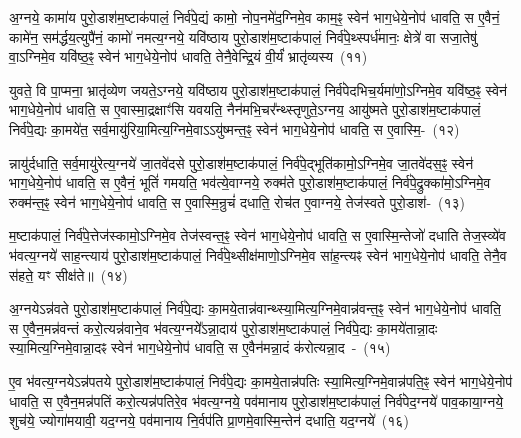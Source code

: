 {\anuvakamend[{व्र॒तप॑तये॒ निशि॑ताया॒न्निर्व॑पे॒त्पुरु॑षाः सङ्ग्रा॒मन्न च॒त्वारि॑ च}]}

अ॒ग्नये॒ कामा॑य पुरो॒डाश॑\-म॒ष्टा\-क॑पालं॒ निर्व॑पे॒द्यं कामो॒ नोप॒नमे॑द॒ग्निमे॒व काम॒ꣴ॒ स्वेन॑ भाग॒धेये॒नोप॑ धावति॒ स ए॒वैनं॒ कामे॑न॒ सम॑र्द्धय॒त्युपै॑नं॒ कामो॑ नमत्य॒ग्नये॒ यवि॑ष्ठाय पुरो॒डाश॑\-म॒ष्टा\-क॑पालं॒ निर्व॑पे॒थ्स्पर्ध॑मानः॒ क्षेत्रे॑ वा सजा॒तेषु॑ वा॒\-ऽग्निमे॒व यवि॑ष्ठ॒ꣴ॒ स्वेन॑ भाग॒धेये॒नोप॑ धावति॒ तेनै॒वेन्द्रि॒यं वी॒र्यं॑ भ्रातृ॑व्यस्य~(११)\ip

युवते॒ वि पा॒प्मना॒ भ्रातृ॑व्येण जयते॒\-ऽग्नये॒ यवि॑ष्ठाय पुरो॒डाश॑\-म॒ष्टा\-क॑पालं॒ निर्व॑पेदभिच॒र्यमा॑णो॒\-ऽग्निमे॒व यवि॑ष्ठ॒ꣴ॒ स्वेन॑ भाग॒धेये॒नोप॑ धावति॒ स ए॒वास्मा॒द्रक्षाꣳ॑सि यवयति॒ नैन॑मभि॒चर᳚न्थ्स्तृणुते॒\-ऽग्नय॒ आयु॑ष्मते पुरो॒डाश॑\-म॒ष्टा\-क॑पालं॒ निर्व॑पे॒द्यः का॒मये॑त॒ सर्व॒मायु॑रिया॒मित्य॒ग्निमे॒वा\-ऽऽ\-यु॑ष्मन्त॒ꣴ॒ स्वेन॑ भाग॒धेये॒नोप॑ धावति॒ स ए॒वास्मि॒-~(१२)\ip

न्नायु॑र्दधाति॒ सर्व॒मायु॑रेत्य॒ग्नये॑ जा॒तवे॑दसे पुरो॒डाश॑\-म॒ष्टा\-क॑पालं॒ निर्व॑पे॒द्भूति॑कामो॒\-ऽग्निमे॒व जा॒तवे॑दस॒ꣴ॒ स्वेन॑ भाग॒धेये॒नोप॑ धावति॒ स ए॒वैनं॒ भूतिं॑ गमयति॒ भव॑त्ये॒वाग्नये॒ रुक्म॑ते पुरो॒डाश॑\-म॒ष्टा\-क॑पालं॒ निर्व॑पे॒द्रुक्का॑मो॒\-ऽग्निमे॒व रुक्म॑न्त॒ꣴ॒ स्वेन॑ भाग॒धेये॒नोप॑ धावति॒ स ए॒वास्मि॒न्रुचं॑ दधाति॒ रोच॑त ए॒वाग्नये॒ तेज॑स्वते पुरो॒डाश॑-~(१३)\ip

म॒ष्टा\-क॑पालं॒ निर्व॑पे॒त्तेज॑स्कामो॒\-ऽग्निमे॒व तेज॑स्वन्त॒ꣴ॒ स्वेन॑ भाग॒धेये॒नोप॑ धावति॒ स ए॒वास्मि॒न्तेजो॑ दधाति तेज॒स्व्ये॑व भ॑वत्य॒ग्नये॑ साह॒न्त्याय॑ पुरो॒डाश॑\-म॒ष्टा\-क॑पालं॒ निर्व॑पे॒थ्सीक्ष॑माणो॒\-ऽग्निमे॒व सा॑ह॒न्त्यꣴ स्वेन॑ भाग॒धेये॒नोप॑ धावति॒ तेनै॒व स॑हते॒ यꣳ सीक्ष॑ते॥~(१४)\ip

{\anuvakamend[{भ्रातृ॑व्यस्यास्मि॒न्तेज॑स्वते पुरो॒डाश॑\-म॒ष्टात्रिꣳ॑शच्च}]}

अ॒ग्नये\-ऽन्न॑वते पुरो॒डाश॑\-म॒ष्टा\-क॑पालं॒ निर्व॑पे॒द्यः का॒मये॒तान्न॑\-वान्थ्स्या॒मित्य॒ग्नि\-मे॒वान्न॑वन्त॒ꣴ॒ स्वेन॑ भाग॒धेये॒नोप॑ धावति॒ स ए॒वैन॒मन्न॑वन्तं करो॒त्यन्न॑वाने॒व भ॑वत्य॒ग्नये᳚\-ऽन्ना॒दाय॑ पुरो॒डाश॑\-म॒ष्टाक॑पालं॒ निर्व॑पे॒द्यः का॒मये॑तान्ना॒दः स्या॒मित्य॒ग्निमे॒वान्ना॒दꣴ स्वेन॑ भाग॒धेये॒नोप॑ धावति॒ स ए॒वैन॑मन्ना॒दं क॑रोत्यन्ना॒द~-~(१५)\ip

ए॒व भ॑वत्य॒ग्नये\-ऽन्न॑पतये पुरो॒डाश॑\-म॒ष्टा\-क॑पालं॒ निर्व॑पे॒द्यः का॒मये॒तान्न॑पतिः स्या॒मित्य॒ग्नि\-मे॒वान्न॑\-पति॒ꣴ॒ स्वेन॑ भाग॒धेये॒नोप॑ धावति॒ स ए॒वैन॒मन्न॑पतिं करो॒त्यन्न॑पतिरे॒व भ॑वत्य॒ग्नये॒ पव॑मानाय पुरो॒डाश॑\-म॒ष्टा\-क॑पालं॒ निर्व॑पेद॒ग्नये॑ पाव॒काया॒ग्नये॒ शुच॑ये॒ ज्योगा॑मयावी॒ यद॒ग्नये॒ पव॑मानाय नि॒र्वप॑ति प्रा॒णमे॒वास्मि॒न्तेन॑ दधाति॒ यद॒ग्नये॑~(१६)\ip

